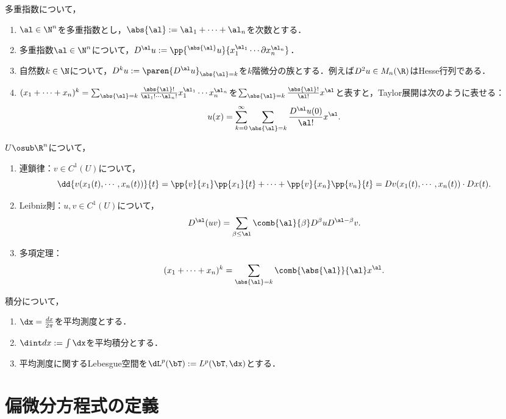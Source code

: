 \documentclass[uplatex,dvipdfmx]{jsreport}
\begin{document}
\begin{notation}
    多重指数について，
    \begin{enumerate}
        \item $\al\in\N^n$を多重指数とし，$\abs{\al}:=\al_1+\cdots+\al_n$を次数とする．
        \item 多重指数$\al\in\N^n$について，$D^\al u:=\pp{^{\abs{\al}}u}{x_1^{\al_1}\cdots\partial x^{\al_n}_n}$．
        \item 自然数$k\in\N$について，$D^ku:=\paren{D^\al u}_{\abs{\al}=k}$を$k$階微分の族とする．例えば$D^2u\in M_n(\R)$はHesse行列である．
        \item $(x_1+\cdots+x_n)^k=\sum_{\abs{\al}=k}\frac{\abs{\al}!}{\al_1!\cdots\al_n!}x_1^{\al_1}\cdots x_n^{\al_n}$を$\sum_{\abs{\al}=k}\frac{\abs{\al}!}{\al!}x^\al$と表すと，Taylor展開は次のように表せる：
        \[u(x)=\sum_{k=0}^\infty\sum_{\abs{\al}=k}\frac{D^\al u(0)}{\al!}x^\al.\]
    \end{enumerate}
\end{notation}

\begin{proposition}\label{prop-chain-rule}
    $U\osub\R^n$について，
    \begin{enumerate}
        \item 連鎖律：$v\in C^1(U)$について，
        \[\dd{v(x_1(t),\cdots,x_n(t))}{t}=\pp{v}{x_1}\pp{x_1}{t}+\cdots+\pp{v}{x_n}\pp{v_n}{t}=Dv(x_1(t),\cdots,x_n(t))\cdot Dx(t).\]
        \item Leibniz則：$u,v\in C^1(U)$について，
        \[D^\al(uv)=\sum_{\beta\le\al}\comb{\al}{\beta}D^\beta uD^{\al-\beta}v.\]
        \item 多項定理：
        \[(x_1+\cdots+x_n)^k=\sum_{\abs{\al}=k}\comb{\abs{\al}}{\al}x^\al.\]
    \end{enumerate}
\end{proposition}

\begin{notation}
    積分について，
    \begin{enumerate}
        \item $\dx=\frac{dx}{2\pi}$を平均測度とする．
        \item $\dint dx:=\int\dx$を平均積分とする．
        \item 平均測度に関するLebesgue空間を$\dL^p(\bT):= L^p(\bT,\dx)$とする．
    \end{enumerate}
\end{notation}

\section{偏微分方程式の定義}
\end{document}
